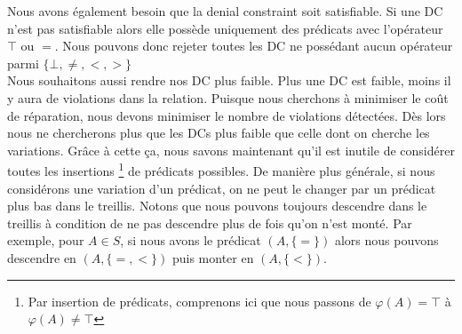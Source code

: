 \documentclass[letterpaper, 12pt]{report}
\theoremstyle{definition}
\newtheorem{mydef}{Définition}
\newtheorem{myprop}{Propriété}
\begin{document}
Nous avons également besoin que la denial constraint soit satisfiable. Si une DC n'est pas satisfiable alors elle possède uniquement des prédicats avec l'opérateur $\top$ ou $=$. Nous pouvons donc rejeter toutes les DC ne possédant aucun opérateur parmi $\{ \bot,\neq,<,> \}$\\

%
%
%
%

Nous souhaitons aussi rendre nos DC plus faible. Plus une DC est faible, moins il y aura de violations dans la relation. Puisque nous cherchons à minimiser le coût de réparation, nous devons minimiser le nombre de violations détectées. Dès lors nous ne chercherons plus que les DCs plus faible que celle dont on cherche les variations. Grâce à cette ça, nous savons maintenant qu'il est inutile de considérer toutes les insertions \footnote{Par insertion de prédicats, comprenons ici que nous passons de $\varphi(A) = \top$ à $\varphi(A) \neq \top$} de prédicats possibles. De manière plus générale, si nous considérons une variation d'un prédicat, on ne peut le changer par un prédicat plus bas dans le treillis. Notons que nous pouvons toujours descendre dans le treillis à condition de ne pas descendre plus de fois qu'on n'est monté. Par exemple, pour $A \in S$, si nous avons le prédicat $(A, \{= \})$ alors nous pouvons descendre en $(A,\{=,<\})$ puis monter en $(A, \{ <\})$.
\end{document}
